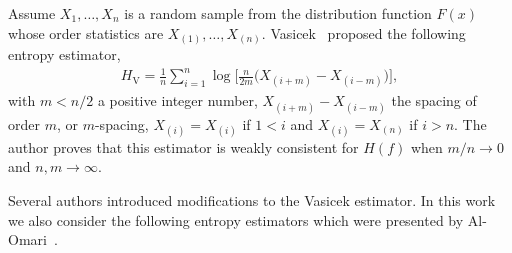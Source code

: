 \documentclass[journal]{IEEEtran}
\begin{document}
Assume $X_1,\dots,X_n$ is a random sample from the distribution function $F(x)$ whose order statistics are $X_{(1)}, \ldots, X_{(n)}$. 
Vasicek~\cite{Vasicek76} proposed the following entropy estimator,
\begin{align}
	\label{HV}
	H_{\text{V}}=\frac{1}{n} \sum_{i=1}^{n} \log \Big[\frac{n}{2 m}\big(X_{(i+m)}-X_{(i-m)}\big)\Big], 
\end{align}
with $m<n/2$ a positive integer number, $X_{(i+m)}-X_{(i-m)}$ the spacing of order $m$, or $m$-spacing, $X_{(i)}=X_{(i)}$ if $1<i$ and $X_{(i)}=X_{(n)}$ if $i>n$.
The author proves that this estimator is weakly consistent for $H(f)$ when $m/n \to 0$ and $n,m \to \infty$.

Several authors introduced modifications to the Vasicek estimator. In this work we also consider the following entropy estimators which were presented by Al-Omari~\cite{AlOmari2016}. 
\end{document}
